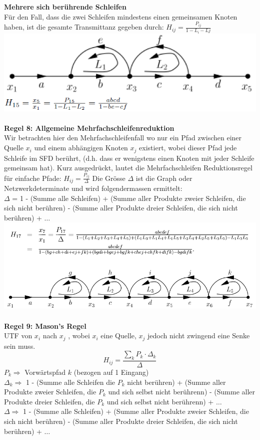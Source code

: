 \textbf{Mehrere sich berührende Schleifen}\\
Für den Fall, dass die zwei Schleifen mindestens einen gemeinsamen
Knoten haben, ist die gesamte Transmittanz gegeben
durch: $H_{ij} = \frac{P_{ij}}{1 - L_i - Lj}$\\
\includegraphics[width=\columnwidth]{Images/sfd_r7c}~\\


\noindent\textbf{Regel 8: Allgemeine Mehrfachschleifenreduktion}\\
 Wir betrachten hier den Mehrfachschleifenfall wo nur ein Pfad
zwischen einer Quelle $x_i$ und einem abhängigen Knoten $x_j$
existiert, wobei dieser Pfad jede Schleife im SFD berührt, (d.h. 
dass er wenigstens einen Knoten mit jeder Schleife gemeinsam
hat). Kurz ausgedrückt, lautet die Mehrfachschleifen Reduktionsregel für 
einfache Pfade: $H_{ij} = \frac{P_{ij}}{\Delta}$
Die Grösse $\Delta$ ist die Graph oder Netzwerkdeterminate und wird folgendermassen ermittelt:~\\
$\Delta$  = 1 - (Summe alle Schleifen) + (Summe aller Produkte zweier Schleifen, die sich nicht berühren) - (Summe aller Produkte dreier Schleifen, die sich nicht berühren) + $\dots$
\includegraphics[width=\columnwidth]{Images/sfd_r8}~\\

\textbf{Regel 9: Mason's Regel}\\
UTF von $x_i$ nach $x_j$ , wobei $x_i$ eine Quelle, $x_j$ jedoch nicht zwingend eine Senke sein muss.
\[
H_{ij} = \frac{\sum_{k}P_k\cdot\Delta_k}{\Delta}
\]
$P_k \Rightarrow$ Vorwärtspfad $k$ (bezogen auf 1 Eingang)\\
$\Delta_k \Rightarrow $ 1 - (Summe alle Schleifen die $P_k$ nicht berühren) + (Summe aller Produkte zweier Schleifen, die $P_k$ und sich selbst nicht berührenn) - (Summe aller Produkte dreier Schleifen, die $P_k$ und sich selbst nicht berührenn) + $\dots$\\
$\Delta \Rightarrow $ 1 - (Summe alle Schleifen) + (Summe aller Produkte zweier Schleifen, die sich nicht berühren) - (Summe aller Produkte dreier Schleifen, die sich nicht berühren) + $\dots$\\


